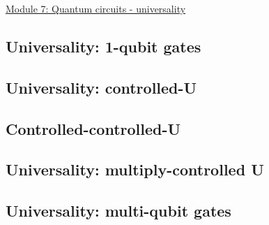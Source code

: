 \documentclass[main.tex]{subfiles}
\begin{document}
\href{https://www2.seas.gwu.edu/~simhaweb/quantum/modules/module7/module7.html}{Module 7: Quantum circuits - universality}

\subsection{Universality: 1-qubit gates}

\subsection{Universality: controlled-U}

\subsection{Controlled-controlled-U}

\subsection{Universality: multiply-controlled U}

\subsection{Universality: multi-qubit gates}
\end{document}
